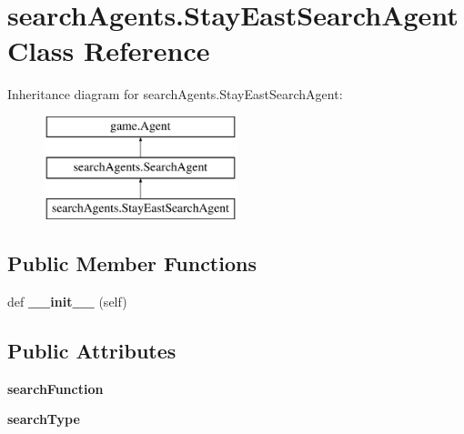 \hypertarget{classsearch_agents_1_1_stay_east_search_agent}{}\section{search\+Agents.\+Stay\+East\+Search\+Agent Class Reference}
\label{classsearch_agents_1_1_stay_east_search_agent}
Inheritance diagram for search\+Agents.\+Stay\+East\+Search\+Agent\+:\begin{figure}[H]
\begin{center}
\leavevmode
\includegraphics[height=3.000000cm]{classsearch_agents_1_1_stay_east_search_agent}
\end{center}
\end{figure}
\subsection*{Public Member Functions}
\begin{DoxyCompactItemize}
\item 
\mbox{\label{classsearch_agents_1_1_stay_east_search_agent_a43052b0d7816b831021ddfd048f6c6e8}} 
def {\bfseries \+\_\+\+\_\+init\+\_\+\+\_\+} (self)
\end{DoxyCompactItemize}
\subsection*{Public Attributes}
\begin{DoxyCompactItemize}
\item 
\mbox{\label{classsearch_agents_1_1_stay_east_search_agent_aded2367f9cbc220937cae300a95c56e8}} 
{\bfseries search\+Function}
\item 
\mbox{\label{classsearch_agents_1_1_stay_east_search_agent_a5fe9d6f2edc6fc40df1492b22bfb3869}} 
{\bfseries search\+Type}
\end{DoxyCompactItemize}


